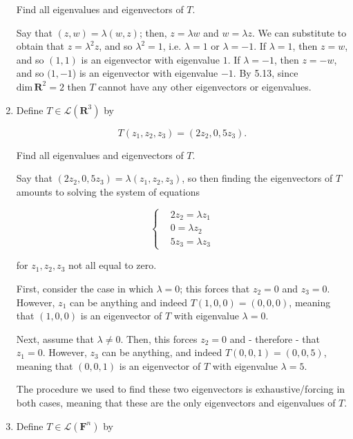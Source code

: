 \documentclass{book}
\begin{document}
\begin{enumerate}
Find all eigenvalues and eigenvectors of \(T\).

Say that \((z,w)=\lambda(w,z)\); then, \(z=\lambda{w}\) and \(w=\lambda{z}\).  We can substitute to obtain that \(z=\lambda^2z\), and so \(\lambda^2=1\), i.e. \(\lambda=1\) or \(\lambda=-1\).  If \(\lambda=1\), then \(z=w\), and so \((1,1)\) is an eigenvector with eigenvalue \(1\).  If \(\lambda=-1\), then \(z=-w\), and so \((1,-1\)) is an eigenvector with eigenvalue \(-1\).  By 5.13, since \(\textrm{dim} \, \textbf{R}^2=2\) then \(T\) cannot have any other eigenvectors or eigenvalues.

\item Define \(T \in \mathcal{L}(\textbf{R}^3)\) by 

\begin{equation*}
    T(z_1,z_2,z_3)=(2z_2,0,5z_3).
\end{equation*}

Find all eigenvalues and eigenvectors of \(T\).

Say that \((2z_2,0,5z_3)=\lambda(z_1,z_2,z_3)\), so then finding the eigenvectors of \(T\) amounts to solving the system of equations

\begin{equation*}
    \begin{cases}
        & 2z_2=\lambda z_1 \\
        & 0=\lambda z_2 \\
        & 5z_3 = \lambda z_3
    \end{cases}
\end{equation*}

for \(z_1,z_2,z_3\) not all equal to zero.

First, consider the case in which \(\lambda = 0\); this forces that \(z_2=0\) and \(z_3=0\).  However, \(z_1\) can be anything and indeed \(T(1,0,0)=(0,0,0)\), meaning that \((1,0,0)\) is an eigenvector of \(T\) with eigenvalue \(\lambda=0\).

Next, assume that \(\lambda \neq 0\).  Then, this forces \(z_2=0\) and - therefore - that \(z_1=0\).  However, \(z_3\) can be anything, and indeed \(T(0,0,1)=(0,0,5)\), meaning that \((0,0,1)\) is an eigenvector of \(T\) with eigenvalue \(\lambda=5\).  

The procedure we used to find these two eigenvectors is exhaustive/forcing in both cases, meaning that these are the only eigenvectors and eigenvalues of \(T\).

\item Define \(T \in \mathcal{L}(\textbf{F}^n)\) by


\end{enumerate}
\end{document}
